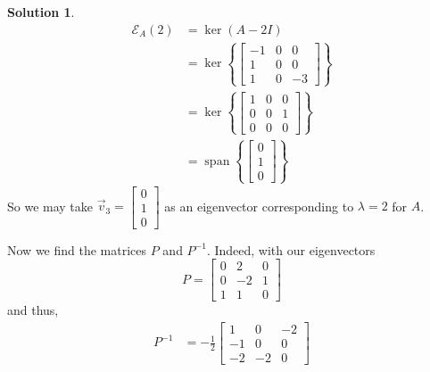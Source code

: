 \documentclass[11pt]{article}
\theoremstyle{definition}\newtheorem{definition}{Definition}
\theoremstyle{definition}\newtheorem{question}{Question}
\theoremstyle{definition}\newtheorem*{solution}{Solution}
\theoremstyle{definition}\newtheorem{example}{Example}
\theoremstyle{definition}\newtheorem{notation}{Notation}
\theoremstyle{theorem}\newtheorem{theorem}{Theorem}
\theoremstyle{theorem}\newtheorem{corollary}{Corollary}
\theoremstyle{theorem}\newtheorem{lemma}{Lemma}
\theoremstyle{theorem}\newtheorem{proposition}{Proposition}
\newcommand{\E}{\mathcal{E}}
\DeclareMathOperator{\Span}{span}
\begin{document}
\begin{solution}
    \begin{align*}
        \E_A(2) &= \ker(A - 2I) \\
        &= \ker\left\{\begin{bmatrix} -1 & 0 & 0 \\ 1 & 0 & 0 \\ 1 & 0 & -3 \end{bmatrix}\right\} \\
        &= \ker\left\{\begin{bmatrix} 1 & 0 & 0 \\ 0 & 0 & 1 \\ 0 & 0 & 0 \end{bmatrix}\right\} \\
        &= \Span\left\{\begin{bmatrix} 0 \\ 1 \\ 0 \end{bmatrix}\right\}
    \end{align*}
    So we may take $\vec{v}_3 = \begin{bmatrix} 0 \\ 1 \\ 0 \end{bmatrix}$ as an eigenvector corresponding to $\lambda = 2$ for $A$.

    Now we find the matrices $P$ and $P^{-1}$. Indeed, with our eigenvectors
    \begin{equation*}
        P = \begin{bmatrix} 0 & 2 & 0 \\ 0 & -2 & 1 \\ 1 & 1 & 0 \end{bmatrix}
    \end{equation*}
    and thus,
    \begin{align*}
        P^{-1} &= -\frac{1}{2} \begin{bmatrix} 1 & 0 & -2 \\ -1 & 0 & 0 \\ -2 & - 2 & 0 \end{bmatrix}
    \end{align*}
    

\end{solution}
\end{document}
